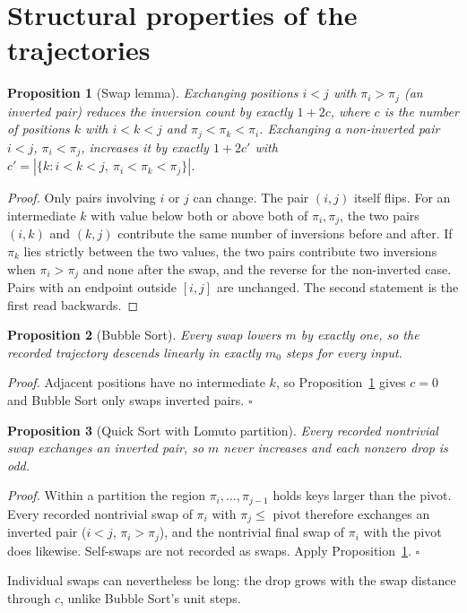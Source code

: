 \documentclass[10pt,journal]{IEEEtran}
\newtheorem{proposition}{Proposition}
\begin{document}
\section{Structural properties of the trajectories}
\label{sec:struct}
\begin{proposition}[Swap lemma]
\label{prop:swap}
Exchanging positions $i<j$ with $\pi_i>\pi_j$ (an inverted pair) reduces the inversion count by exactly $1+2c$, where $c$ is the number of positions $k$ with $i<k<j$ and $\pi_j<\pi_k<\pi_i$. Exchanging a non-inverted pair $i<j$, $\pi_i<\pi_j$, increases it by exactly $1+2c'$ with $c'=|\{k:i<k<j,\ \pi_i<\pi_k<\pi_j\}|$.
\end{proposition}
\begin{proof}
Only pairs involving $i$ or $j$ can change. The pair $(i,j)$ itself flips. For an intermediate $k$ with value below both or above both of $\pi_i,\pi_j$, the two pairs $(i,k)$ and $(k,j)$ contribute the same number of inversions before and after. If $\pi_k$ lies strictly between the two values, the two pairs contribute two inversions when $\pi_i>\pi_j$ and none after the swap, and the reverse for the non-inverted case. Pairs with an endpoint outside $[i,j]$ are unchanged. The second statement is the first read backwards.
\end{proof}

\begin{proposition}[Bubble Sort]
Every swap lowers $m$ by exactly one, so the recorded trajectory descends linearly in exactly $m_0$ steps for every input.
\end{proposition}
\emph{Proof.} Adjacent positions have no intermediate $k$, so Proposition~\ref{prop:swap} gives $c=0$ and Bubble Sort only swaps inverted pairs. \hfill$\square$

\begin{proposition}[Quick Sort with Lomuto partition]
Every recorded nontrivial swap exchanges an inverted pair, so $m$ never increases and each nonzero drop is odd.
\end{proposition}
\emph{Proof.} Within a partition the region $\pi_i,\dots,\pi_{j-1}$ holds keys larger than the pivot. Every recorded nontrivial swap of $\pi_i$ with $\pi_j\le$ pivot therefore exchanges an inverted pair ($i<j$, $\pi_i>\pi_j$), and the nontrivial final swap of $\pi_i$ with the pivot does likewise. Self-swaps are not recorded as swaps. Apply Proposition~\ref{prop:swap}. \hfill$\square$

Individual swaps can nevertheless be long: the drop grows with the swap distance through $c$, unlike Bubble Sort's unit steps.
\end{document}
